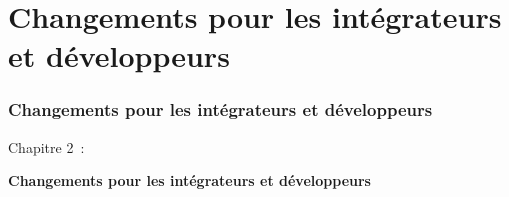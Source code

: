 %

\section{Changements pour les intégrateurs et développeurs}
\begin{frame}[fragile]
	\frametitle{Changements pour les intégrateurs et développeurs}

	\begin{center}\huge{Chapitre 2~:}\end{center}
	\begin{center}\huge{\color{typo3darkgrey}\textbf{Changements pour les intégrateurs et développeurs}}\end{center}

\end{frame}

